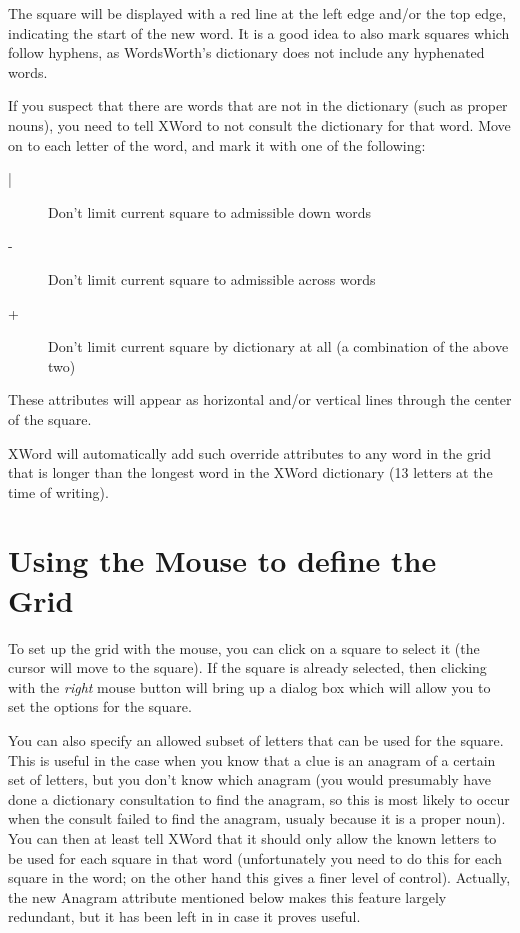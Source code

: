The square will be displayed with a red line at the left edge
and/or the top edge, indicating the start of the new word.
It is a good idea to also mark squares which follow hyphens,
as WordsWorth's dictionary does not include any hyphenated words.

If you suspect that there are words that are not in the dictionary
(such as proper nouns), you need to tell XWord to not consult
the dictionary for that word. Move on to each letter of the word,
and mark it with one of the following:

\begin{description}
\item [|] Don't limit current square to admissible down words
\item [-] Don't limit current square to admissible across words
\item [+] Don't limit current square by dictionary at all (a combination
of the above two)
\end{description}

These attributes will appear as horizontal and/or vertical 
lines through the center of the square.

XWord will automatically add such override attributes to any word
in the grid that is longer than the longest word in the XWord
dictionary (13 letters at the time of writing).

\section{Using the Mouse to define the Grid}

To set up the grid with the mouse, you can click on a square
to select it (the cursor will move to the square). If the square
is already selected, then clicking with the {\em right} mouse button
will bring up a dialog box which will allow you to set the options
for the square. 

You can also
specify an allowed subset of letters that can be used for the
square. This is useful in the case when you know that a clue 
is an anagram of a certain set of letters, but you don't know 
which anagram (you would presumably have done a dictionary 
consultation to find the anagram, so this is most likely to
occur when the consult failed to find the anagram, usualy
because it is a proper noun). You can then at least tell XWord
that it should only allow the known letters to be used for each
square in that word (unfortunately you need to do this for
each square in the word; on the other hand this gives a finer
level of control). Actually, the new Anagram attribute mentioned 
below makes this feature largely redundant, but it has been left 
in in case it proves useful.

